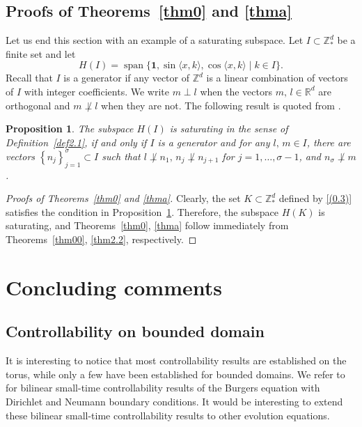 \documentclass[review]{elsarticle}
\newtheorem{proposition}{Proposition}[section]
\theoremstyle{dotless}
\numberwithin{equation}{section}
\begin{document}
\subsection{Proofs of Theorems~\ref{thm0} and \ref{thma}}
Let us end this section with an example of a saturating subspace. Let $I \subset \mathbb{Z}_*^d$ be a finite set and let
\begin{equation*}\label{(2.11)}
H(I)=\operatorname{span}\{\mathbf{1}, \sin \langle x, k\rangle, \cos \langle x, k\rangle\mid k \in I\} .
\end{equation*}
Recall that $I$ is a generator if any vector of $\mathbb{Z}^d$ is a linear combination of vectors of $I$ with integer coefficients. We write $m \perp l$ when the vectors $m,\, l \in \mathbb{R}^d$ are orthogonal and $m \not\perp l$ when they are not.
The following result is quoted from \cite[Proposition 2.6]{Duca_EMS}.
\begin{proposition}\label{prop2.6}
The subspace $H(I)$ is saturating in the sense of Definition~\ref{def2.1}, if and only if $I$ is a generator and for any $l,\, m \in I$, there are vectors $\left\{n_j\right\}_{j=1}^\sigma \subset I$ such that $l \not \perp n_1,\, n_j \not \perp n_{j+1}$ for $j=1, \ldots, \sigma-1$, and $n_\sigma \not \perp m$.
\end{proposition}
\begin{proof}[Proofs of Theorems~\ref{thm0} and \ref{thma}]
	Clearly, the set $K \subset \mathbb{Z}_*^d$ defined by \eqref{(0.3)} satisfies the condition in  Proposition~\ref{prop2.6}. Therefore, the subspace $H(K)$ is saturating, and Theorems~\ref{thm0}, \ref{thma}
	follow immediately from Theorems~\ref{thm00}, \ref{thm2.2}, respectively.
\end{proof}

\section{Concluding comments}\label{sec:conclud}
\subsection{Controllability on bounded domain}
It is interesting to notice that most controllability results are established on the torus, while only a few have been established for bounded domains. We refer to \cite[Section~6 and Section~7]{Duca_Burgers} for bilinear small-time controllability results of the Burgers equation with Dirichlet and Neumann boundary conditions. It would be interesting to extend these bilinear small-time controllability results to other evolution equations.
\end{document}
